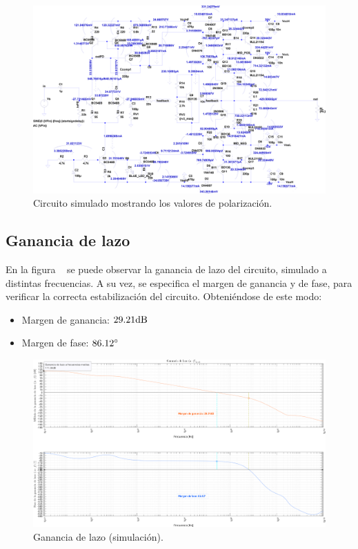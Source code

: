 \begin{figure}[H]
    \centering
    \includegraphics[scale=0.80, angle=90]{./img/circuito/amplifier.png}
    \caption{Circuito simulado mostrando los valores de polarización.}
    \label{fig:PuntoQ_simulacion}
\end{figure}

\clearpage

\subsection{Ganancia de lazo}

\par En la figura ~ se puede observar la ganancia de lazo del circuito, simulado a distintas frecuencias. A su vez, se especifica el margen de ganancia y de fase, para verificar la correcta estabilización del circuito. Obteniéndose de este modo:

\begin{itemize}
    \item Margen de ganancia: $29.21 \si[per-mode=symbol]{\decibel}$
    \item Margen de fase: $86.12 \si[per-mode=symbol]{\degree}$
\end{itemize}

\vfill

\clearpage

\begin{figure}[H]
    \centering
    \includegraphics[angle=90,scale=0.45]{./img/simulaciones/Loop/gain_loop.png}
    \caption{Ganancia de lazo (simulación).}
    \label{fig:gain_loop_sim}
\end{figure}

